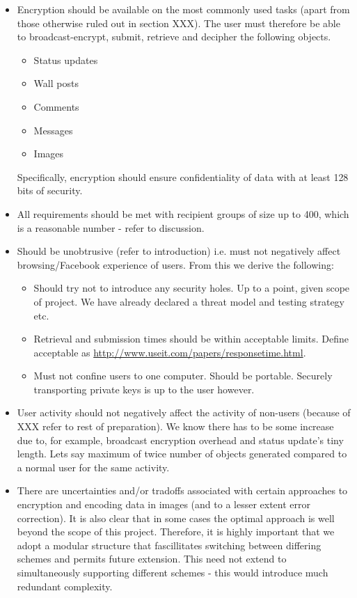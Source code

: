 \begin{itemize}

    \item Encryption should be available on the most commonly used tasks (apart from those otherwise ruled out in section XXX). The user must therefore be able to broadcast-encrypt, submit, retrieve and decipher the following objects.
    
    \begin{itemize}
        \item Status updates
        \item Wall posts
        \item Comments
        \item Messages
        \item Images
    \end{itemize}
    
    Specifically, encryption should ensure confidentiality of data with at least 128 bits of security.
    
    \item All requirements should be met with recipient groups of size up to 400, which is a reasonable number - refer to discussion.
    
    \item Should be unobtrusive (refer to introduction) i.e. must not negatively affect browsing/Facebook experience of users. From this we derive the following:
    \begin{itemize}
        \item Should try not to introduce any security holes. Up to a point, given scope of project. We have already declared a threat model and testing strategy etc.
        \item Retrieval and submission times should be within acceptable limits. Define acceptable as \url{http://www.useit.com/papers/responsetime.html}.
        \item Must not confine users to one computer. Should be portable. Securely transporting private keys is up to the user however.
    \end{itemize}
    
    \item User activity should not negatively affect the activity of non-users (because of XXX refer to rest of preparation). We know there has to be some increase due to, for example, broadcast encryption overhead and status update's tiny length. Lets say maximum of twice number of objects generated compared to a normal user for the same activity.

    \item There are uncertainties and/or tradoffs associated with certain approaches to encryption and encoding data in images (and to a lesser extent error correction). It is also clear that in some cases the optimal approach is well beyond the scope of this project. Therefore, it is highly important that we adopt a modular structure that fascillitates switching between differing schemes and permits future extension. This need not extend to simultaneously supporting different schemes - this would introduce much redundant complexity.
    
    
\end{itemize}